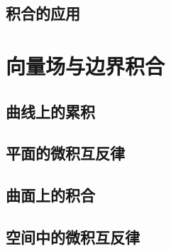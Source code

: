 \documentclass[12pt,UTF8]{ctexbook}
\begin{document}
\section{积合的应用}

\chapter{向量场与边界积合}

\section{曲线上的累积}

\section{平面的微积互反律}

\section{曲面上的积合}

\section{空间中的微积互反律}
\end{document}
